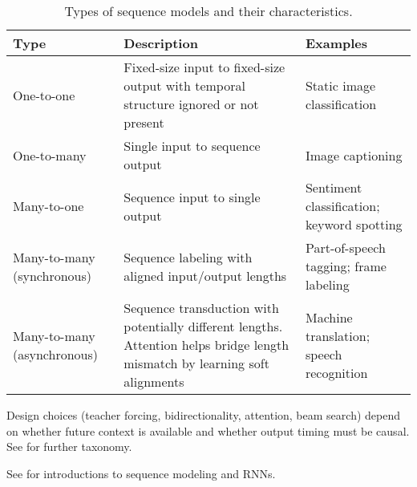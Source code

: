 \begin{table}[h]
\centering
\begin{tabular}{|l|p{}|p{}|}
\hline
\textbf{Type} & \textbf{Description} & \textbf{Examples} \\
\hline
One-to-one & Fixed-size input to fixed-size output with temporal structure ignored or not present & Static image classification \\
\hline
One-to-many & Single input to sequence output & Image captioning \\
\hline
Many-to-one & Sequence input to single output & Sentiment classification; keyword spotting \\
\hline
Many-to-many (synchronous) & Sequence labeling with aligned input/output lengths & Part-of-speech tagging; frame labeling \\
\hline
Many-to-many (asynchronous) & Sequence transduction with potentially different lengths. Attention helps bridge length mismatch by learning soft alignments \cite{Bahdanau2014} & Machine translation; speech recognition \\
\hline
\end{tabular}
\caption{Types of sequence models and their characteristics.}
\label{tab:sequence-types}
\end{table}

Design choices (teacher forcing, bidirectionality, attention, beam search) depend on whether future context is available and whether output timing must be causal. See \cite{D2LChapterRNN,WebRNNWikipedia} for further taxonomy.


See \cite{GoodfellowEtAl2016,Prince2023,Bishop2006,WebRNNWikipedia,WebDLBRNN,D2LChapterRNN} for introductions to sequence modeling and RNNs.

